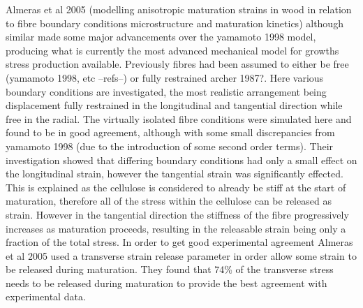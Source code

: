 Almeras et al 2005 (modelling anisotropic maturation strains in wood in
relation to fibre boundary conditions microstructure and maturation kinetics)
although similar made some major advancements over the yamamoto 1998 model,
producing what is currently the most advanced mechanical model for growths
stress production available. Previously fibres had been assumed to either be
free (yamamoto 1998, etc --refs--) or fully restrained archer 1987?. Here
various boundary conditions are investigated, the most realistic arrangement being
displacement fully restrained in the longitudinal and tangential direction while
free in the radial. The virtually isolated fibre conditions were simulated here
and found to be in good agreement, although with some small discrepancies from
yamamoto 1998 (due to the introduction of some second order terms).  Their
investigation showed that differing boundary conditions had only a small effect
on the longitudinal strain, however the tangential strain was significantly
effected. This is explained as the cellulose is considered to already be stiff at
the start of maturation, therefore all of the stress within the cellulose can be
released as strain. However in the tangential direction the stiffness of the
fibre progressively increases as maturation proceeds, resulting in the
releasable strain being only a fraction of the total stress. In order to get good
experimental agreement Almeras et al 2005 used a transverse strain release
parameter in order allow some strain to be released during maturation. They
found that 74\% of the transverse stress needs to be released during maturation
to provide the best agreement with experimental data.
